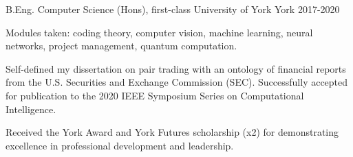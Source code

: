 
\begin{cventries}
  \cventry
    {B.Eng. Computer Science (Hons), first-class} %
    {University of York} %
    {York} %
    {2017-2020} %
    {
      \begin{cvitems} %
         \item {Modules taken: coding theory, computer vision, machine learning, neural networks, project management, quantum computation.}
         \vspace{0.5mm}
         \item {Self-defined my dissertation on pair trading with an ontology of financial reports from the U.S. Securities and Exchange Commission (SEC). Successfully accepted for publication to the 2020 IEEE Symposium Series on Computational Intelligence.}
         \vspace{0.5mm}
         \item{Received the York Award and York Futures scholarship (x2) for demonstrating excellence in professional development and leadership.}
      \end{cvitems}
    }
\end{cventries}